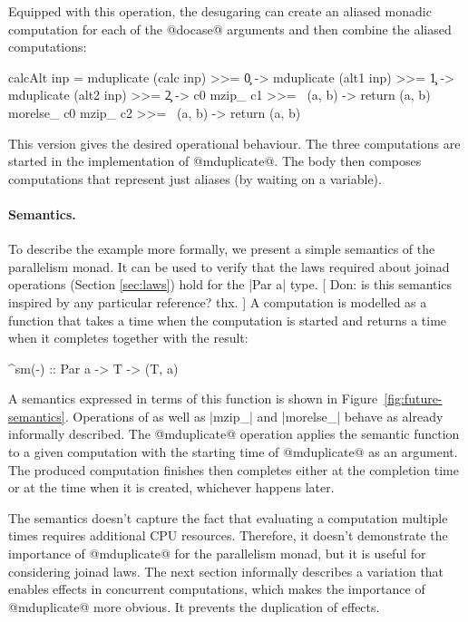 \documentclass[preprint]{sigplanconf}
\begin{document}
Equipped with this operation, the desugaring can create an aliased monadic computation for each
of the @docase@ arguments and then combine the aliased computations:

\begin{code}
calcAlt inp = 
  mduplicate (calc inp) >>= \c0 ->
  mduplicate (alt1 inp) >>= \c1 ->
  mduplicate (alt2 inp) >>= \c2 ->
  c0 mzip_ c1 >>= \ (a, b) -> return (a, b) morelse_
  c0 mzip_ c2 >>= \ (a, b) -> return (a, b)
\end{code}
This version gives the desired operational behaviour. The three computations are started in 
the implementation of @mduplicate@. The body then composes computations that represent
just aliases (by waiting on a variable).

\paragraph{Semantics.} To describe the example more formally, we present a simple semantics
of the parallelism monad. It can be used to verify that the laws required about joinad operations 
(Section \ref{sec:laws}) hold for the |Par a| type. [ Don: is this semantics inspired by any particular reference? thx. ]
A computation is modelled as a function that
takes a time when the computation is started and returns a time when it completes together with
the result:

\begin{code}
^sm(-) :: Par a -> T -> (T, a)
\end{code}
A semantics expressed in terms of this function is shown in Figure~\ref{fig:future-semantics}.
Operations of  as well as |mzip_| and |morelse_| behave as already informally described.
The @mduplicate@ operation applies the semantic function to a given computation with the starting 
time of @mduplicate@ as an argument. The produced computation finishes then completes either at 
the completion time or at the time when it is created, whichever happens later.

The semantics doesn't capture the fact that evaluating a computation multiple times requires 
additional CPU resources. Therefore, it doesn't demonstrate the importance of @mduplicate@ for
the parallelism monad, but it is useful for considering joinad laws. The next section
informally describes a variation that enables effects in concurrent computations, which makes
the importance of @mduplicate@ more obvious. It prevents the duplication of effects. 
\end{document}
